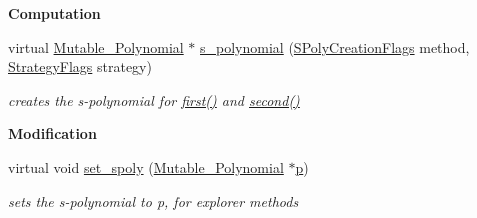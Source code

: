 \begin{Indent}\textbf{ Computation}\par
\begin{DoxyCompactItemize}
\item 
\mbox{\label{group___g_b_computation_aedcb486aa7298a6ed5a1980890df0780}} 
virtual \hyperlink{group__polygroup_class_mutable___polynomial}{Mutable\+\_\+\+Polynomial} $\ast$ \hyperlink{group___g_b_computation_aedcb486aa7298a6ed5a1980890df0780}{s\+\_\+polynomial} (\hyperlink{group___g_b_computation_ga73257b8a2d5cc826853a71b77d0cebf2}{S\+Poly\+Creation\+Flags} method, \hyperlink{group__strategygroup_ga0ee6c8e033547330e6b89929730007f4}{Strategy\+Flags} strategy)
\begin{DoxyCompactList}\small\item\em creates the s-\/polynomial for \hyperlink{group___g_b_computation_a6e251e3724fde2c610d921f93889eb67}{first()} and \hyperlink{group___g_b_computation_a06da1cbbe1451962b68f2bbf90855fae}{second()} \end{DoxyCompactList}\end{DoxyCompactItemize}
\end{Indent}
\begin{Indent}\textbf{ Modification}\par
\begin{DoxyCompactItemize}
\item 
\mbox{\label{group___g_b_computation_ad3ba8ead12784e3133eedf75e7601326}} 
virtual void \hyperlink{group___g_b_computation_ad3ba8ead12784e3133eedf75e7601326}{set\+\_\+spoly} (\hyperlink{group__polygroup_class_mutable___polynomial}{Mutable\+\_\+\+Polynomial} $\ast$\hyperlink{group___g_b_computation_ac80ca2c599a7c234e01e5377292d9a5a}{p})
\begin{DoxyCompactList}\small\item\em sets the s-\/polynomial to {\ttfamily p}, for explorer methods \end{DoxyCompactList}\end{DoxyCompactItemize}
\end{Indent}
